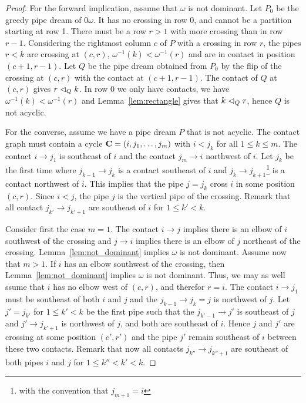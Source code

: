 \begin{proof} For the forward implication, assume that $\omega$ is not dominant. 
Let $P_0$ be the greedy pipe dream of $0\omega$. It has no crossing in row 0, and cannot be a partition starting at row 1.
There must be a row $r>1$ with more crossing than in row $r-1$. 
Considering the rightmost column $c$ of $P$ with a crossing in row $r$,  the pipes $r<k$ are crossing at $(c,r)$, $\omega^{-1}(k)<\omega^{-1}(r)$ and are in contact in position $(c+1,r-1)$.
Let $Q$ be the pipe dream obtained from $P_0$ by the flip of the crossing at $(c,r)$ with the contact at $(c+1,r-1)$.
The contact of $Q$ at $(c,r)$ gives $r\vartriangleleft_{Q} k$. In row $0$ we only have contacts, we have $\omega^{-1}(k)<\omega^{-1}(r)$ and Lemma~\ref{lem:rectangle} gives  that 
$k \vartriangleleft_{Q} r$, hence $Q$ is not acyclic.

For the converse, assume we have a pipe dream $P$ that is not acyclic. The contact graph must contain a cycle ${\bf C}=(i, j_1, \ldots, j_m)$ with $i<j_k$ for all $1\le k\le m$. 
The contact $i \to j_1$ is southeast of $i$ and the contact  $j_m\to i$ northwest of $i$. 
Let $j_k$ be the first time where $j_{k-1}\to j_k$ is a contact southeast of $i$ and $j_k \to j_{k+1}$\footnote{with the convention that $j_{m+1}=i$} is a contact northwest of $i$.
This implies that the pipe $j=j_k$ cross $i$ in some position $(c,r)$. Since $i<j$, the pipe $j$ is the vertical pipe of the crossing. 
Remark that all contact $j_{k'}\to j_{k'+1}$ are southeast of $i$ for $1\le k' <k$.

Consider first the case $m=1$. The contact $i\to j$ implies there is an elbow  of $i$ southwest of the crossing and  $j\to i$ implies there is an elbow of $j$  northeast of the crossing. 
Lemma~\ref{lem:not_dominant} implies  $\omega$ is not dominant.
Assume now that $m>1$. If $i$ has an elbow southwest of the crossing, then Lemma~\ref{lem:not_dominant} implies  $\omega$ is not dominant.
Thus, we may as well ssume that $i$ has no elbow west of $(c,r)$, and therefor $r=i$. The contact $i\to j_1$ must be southeast of both $i$ and $j$ and the  $j_{k-1}\to j_k=j$ is northwest of $j$.
Let  $j'=j_{k'}$ for $1\le k' <k$ be the first pipe such that the $j_{k'-1}\to j'$ is southeast of $j$ and $j'\to j_{k'+1}$ is northwest of $j$, and both are southeast of $i$. 
Hence $j$ and $j'$ are crossing at some position $(c',r')$ and the pipe $j'$ remain southeast of $i$ between these two contacts.
Remark that now all contacts $j_{k''}\to j_{k''+1}$ are southeast of both pipes  $i$ and $j$ for $1\le k'' <k' < k$.



\end{proof}
